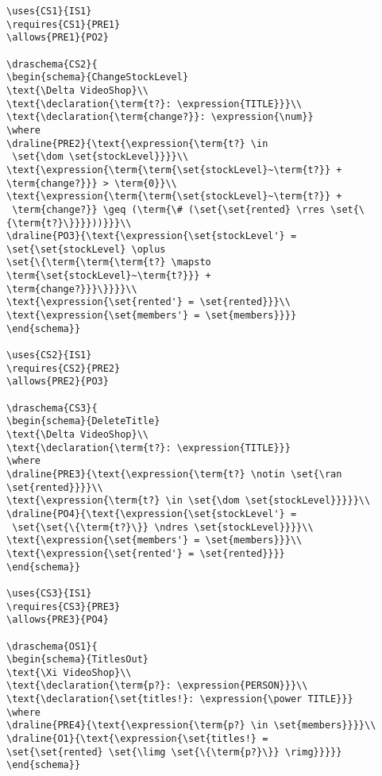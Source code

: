\begin{verbatim}
\uses{CS1}{IS1}
\requires{CS1}{PRE1}
\allows{PRE1}{PO2}

\draschema{CS2}{
\begin{schema}{ChangeStockLevel}
\text{\Delta VideoShop}\\
\text{\declaration{\term{t?}: \expression{TITLE}}}\\
\text{\declaration{\term{change?}}: \expression{\num}}
\where
\draline{PRE2}{\text{\expression{\term{t?} \in
 \set{\dom \set{stockLevel}}}}\\
\text{\expression{\term{\term{\set{stockLevel}~\term{t?}} + \term{change?}}} > \term{0}}\\
\text{\expression{\term{\term{\set{stockLevel}~\term{t?}} +
 \term{change?}} \geq (\term{\# (\set{\set{rented} \rres \set{\{\term{t?}\}}}}))}}}\\
\draline{PO3}{\text{\expression{\set{stockLevel'} = 
\set{\set{stockLevel} \oplus 
\set{\{\term{\term{\term{t?} \mapsto \term{\set{stockLevel}~\term{t?}}} + 
\term{change?}}}\}}}}\\
\text{\expression{\set{rented'} = \set{rented}}}\\
\text{\expression{\set{members'} = \set{members}}}}
\end{schema}}

\uses{CS2}{IS1}
\requires{CS2}{PRE2}
\allows{PRE2}{PO3}

\draschema{CS3}{
\begin{schema}{DeleteTitle}
\text{\Delta VideoShop}\\
\text{\declaration{\term{t?}: \expression{TITLE}}}
\where
\draline{PRE3}{\text{\expression{\term{t?} \notin \set{\ran \set{rented}}}}\\
\text{\expression{\term{t?} \in \set{\dom \set{stockLevel}}}}}\\
\draline{PO4}{\text{\expression{\set{stockLevel'} =
 \set{\set{\{\term{t?}\}} \ndres \set{stockLevel}}}}\\
\text{\expression{\set{members'} = \set{members}}}\\
\text{\expression{\set{rented'} = \set{rented}}}}
\end{schema}}

\uses{CS3}{IS1}
\requires{CS3}{PRE3}
\allows{PRE3}{PO4}

\draschema{OS1}{
\begin{schema}{TitlesOut}
\text{\Xi VideoShop}\\
\text{\declaration{\term{p?}: \expression{PERSON}}}\\
\text{\declaration{\set{titles!}: \expression{\power TITLE}}}
\where
\draline{PRE4}{\text{\expression{\term{p?} \in \set{members}}}}\\
\draline{O1}{\text{\expression{\set{titles!} = 
\set{\set{rented} \set{\limg \set{\{\term{p?}\}} \rimg}}}}}
\end{schema}}


\end{verbatim}
